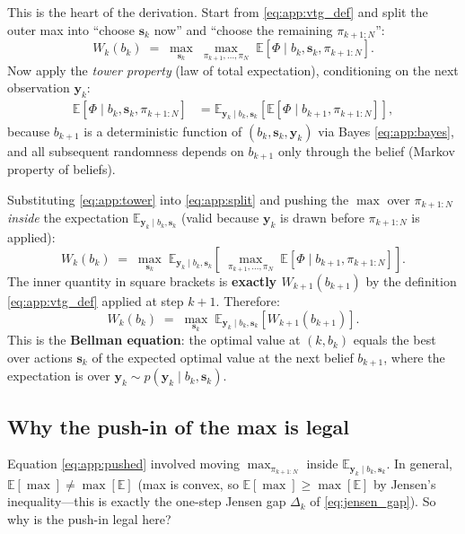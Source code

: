 \documentclass[11pt,a4paper]{article}
\newcommand{\E}{\mathbb{E}}
\begin{document}
This is the heart of the derivation.  Start from \eqref{eq:app:vtg_def} and split the outer max into ``choose $\bm{s}_k$ now'' and ``choose the remaining $\pi_{k+1:N}$'':
\begin{equation}
  W_k(b_k) \;=\; \max_{\bm{s}_k}\; \max_{\pi_{k+1}, \ldots, \pi_N}\; \E\!\left[\Phi \mid b_k, \bm{s}_k, \pi_{k+1:N}\right].
  \label{eq:app:split}
\end{equation}
Now apply the \emph{tower property} (law of total expectation), conditioning on the next observation $\bm{y}_k$:
\begin{align}
  \E\!\left[\Phi \mid b_k, \bm{s}_k, \pi_{k+1:N}\right] &= \E_{\bm{y}_k \mid b_k, \bm{s}_k}\!\left[\E\!\left[\Phi \mid b_{k+1}, \pi_{k+1:N}\right]\right],
  \label{eq:app:tower}
\end{align}
because $b_{k+1}$ is a deterministic function of $(b_k, \bm{s}_k, \bm{y}_k)$ via Bayes \eqref{eq:app:bayes}, and all subsequent randomness depends on $b_{k+1}$ only through the belief (Markov property of beliefs).

Substituting \eqref{eq:app:tower} into \eqref{eq:app:split} and pushing the $\max$ over $\pi_{k+1:N}$ \emph{inside} the expectation $\E_{\bm{y}_k \mid b_k, \bm{s}_k}$ (valid because $\bm{y}_k$ is drawn before $\pi_{k+1:N}$ is applied):
\begin{equation}
  W_k(b_k) \;=\; \max_{\bm{s}_k}\; \E_{\bm{y}_k \mid b_k, \bm{s}_k}\!\left[\;\max_{\pi_{k+1}, \ldots, \pi_N}\; \E\!\left[\Phi \mid b_{k+1}, \pi_{k+1:N}\right]\right].
  \label{eq:app:pushed}
\end{equation}
The inner quantity in square brackets is \textbf{exactly $W_{k+1}(b_{k+1})$} by the definition \eqref{eq:app:vtg_def} applied at step $k+1$.  Therefore:
\begin{equation}
  \boxed{\;W_k(b_k) \;=\; \max_{\bm{s}_k}\; \E_{\bm{y}_k \mid b_k, \bm{s}_k}\!\left[W_{k+1}(b_{k+1})\right].\;}
  \label{eq:app:bellman}
\end{equation}
This is the \textbf{Bellman equation}: the optimal value at $(k, b_k)$ equals the best over actions $\bm{s}_k$ of the expected optimal value at the next belief $b_{k+1}$, where the expectation is over $\bm{y}_k \sim p(\bm{y}_k \mid b_k, \bm{s}_k)$.

\subsection{Why the push-in of the max is legal}

Equation \eqref{eq:app:pushed} involved moving $\max_{\pi_{k+1:N}}$ inside $\E_{\bm{y}_k \mid b_k, \bm{s}_k}$.  In general, $\E[\max] \neq \max[\E]$ (max is convex, so $\E[\max] \ge \max[\E]$ by Jensen's inequality---this is exactly the one-step Jensen gap $\Delta_k$ of \eqref{eq:jensen_gap}).  So why is the push-in legal here?
\end{document}
